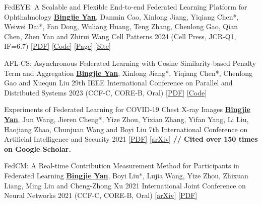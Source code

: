 \begin{cvpublications}

\cvpublication
{FedEYE: A Scalable and Flexible End-to-end Federated Learning Platform for Ophthalmology} %
{\underline{\textbf{Bingjie Yan}}, Danmin Cao, Xinlong Jiang, Yiqiang Chen*, Weiwei Dai*, Fan Dong, Wuliang Huang, Teng Zhang, Chenlong Gao, Qian Chen, Zhen Yan and Zhirui Wang} %
{Cell Patterns} %
{2024} %
{(Cell Press, JCR-Q1, IF=6.7)} %
{\href{https://www.cell.com/patterns/fulltext/S2666-3899(24)00019-9}{[PDF]} \href{https://github.com/beiyuouo/FedEYE}{[Code]} \href{https://www.bj-yan.top/FedEYE/}{[Page]} \href{https://fedeye.aierchina.com/}{[Site]}} %


\cvpublication
{AFL-CS: Asynchronous Federated Learning with Cosine Similarity-based Penalty Term and Aggregation} %
{\underline{\textbf{Bingjie Yan}}, Xinlong Jiang*, Yiqiang Chen*, Chenlong Gao and Xuequn Liu} %
{29th IEEE International Conference on Parallel and Distributed Systems} %
{2023} %
{(CCF-C, CORE-B, \textcolor{awesome}{Oral})} %
{\href{https://ieeexplore.ieee.org/document/10476054}{[PDF]} \href{https://github.com/beiyuouo/AFL-CS-ICPADS}{[Code]}} %


\cvpublication
{Experiments of Federated Learning for COVID-19 Chest X-ray Images} %
{\underline{\textbf{Bingjie Yan}}, Jun Wang, Jieren Cheng*, Yize Zhou, Yixian Zhang, Yifan Yang, Li Liu, Haojiang Zhao, Chunjuan Wang and Boyi Liu} %
{7th International Conference on Artificial Intelligence and Security} %
{2021} %
{} %
{
	\href{https://link.springer.com/chapter/10.1007/978-3-030-78618-2_4}{[PDF]} \href{https://arxiv.org/abs/2007.05592}{[arXiv]}
	\newline \textbf{// Cited over 150 times on Google Scholar.} 
} %


\cvpublication
{FedCM: A Real-time Contribution Measurement Method for Participants in Federated Learning} %
{\underline{\textbf{Bingjie Yan}}, Boyi Liu*, Lujia Wang, Yize Zhou, Zhixuan Liang, Ming Liu and Cheng-Zhong Xu} %
{2021 International Joint Conference on Neural Networks} %
{2021} %
{(CCF-C, CORE-B, \textcolor{awesome}{Oral})} %
{\href{https://arxiv.org/abs/2009.03510}{[arXiv]} \href{https://ieeexplore.ieee.org/abstract/document/9534451/}{[PDF]}} %


\end{cvpublications}
